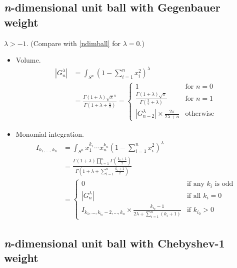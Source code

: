 \documentclass[draft]{scrartcl}
\begin{document}
\subsection*{\textit{n}-dimensional unit ball with Gegenbauer weight}
  $\lambda > -1.$ (Compare with \eqref{ndimball} for $\lambda = 0$.) \cite{3695653}
\begin{itemize}
  \item Volume.
  \[
    \begin{split}
    |G_n^{\lambda}|
      &= \int_{S^n} \left(1 - \sum_{i=1}^n x_i^2\right)^\lambda\\
      &= \frac{
        \Gamma(1+\lambda)\sqrt{\pi}^n
      }{
        \Gamma\left(1+\lambda + \frac{n}{2}\right)
      }
      = \begin{cases}
        1&\text{for $n=0$}\\
        \frac{\Gamma(1+\lambda)\sqrt{\pi}}{\Gamma\left(\frac{3}{2} + \lambda\right)}&\text{for $n=1$}\\
        |G_{n-2}^{\lambda}|\times \frac{2\pi}{2\lambda + n}&\text{otherwise}
      \end{cases}
    \end{split}
  \]

  \item Monomial integration.
  \[
    \begin{split}
    I_{k_1,\dots,k_n}
      &= \int_{S^n} x_1^{k_1}\cdots x_n^{k_n} \left(1 - \sum_{i=1}^n
      x_i^2\right)^\lambda\\
      &= \frac{
        \Gamma(1+\lambda)\prod_{i=1}^n \Gamma\left(\frac{k_i+1}{2}\right)
      }{
        \Gamma\left(1+\lambda + \sum_{i=1}^n \frac{k_i+1}{2}\right)
      }\\
      &= \begin{cases}
        0&\text{if any $k_i$ is odd}\\
        |G_n^{\lambda}|&\text{if all $k_i=0$}\\
        I_{k_1,\dots,k_{i_0}-2,\dots,k_n} \times \frac{k_{i_0}-1}{2\lambda + \sum_{i=1}^n(k_i+1)}&\text{if $k_{i_0} > 0$}
      \end{cases}
    \end{split}
  \]
\end{itemize}


\subsection*{\textit{n}-dimensional unit ball with Chebyshev-1 weight}
\end{document}
